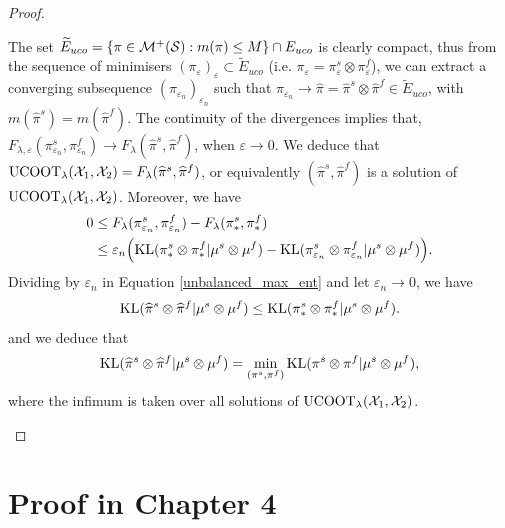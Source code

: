 \begin{proof}
\begin{enumerate}
    The set $\widetilde{E}_{uco} = \{\pi \in \mathcal M^+(\mathcal S): m(\pi) \leq M\} \cap E_{uco}$
    is clearly compact, thus from the sequence of minimisers
    $(\pi_{\varepsilon})_{\varepsilon} \subset \widetilde{E}_{uco}$
    (i.e. $\pi_{\varepsilon} = \pi_{\varepsilon}^s \otimes \pi_{\varepsilon}^f$), we can extract a
    converging subsequence $(\pi_{\varepsilon_n})_{\varepsilon_n}$ such that
    $\pi_{\varepsilon_n} \to \widehat{\pi} = \widehat{\pi}^s \otimes \widehat{\pi}^f \in \widetilde{E}_{uco}$,
    with $m(\widehat{\pi}^s) = m(\widehat{\pi}^f)$.
    The continuity of the divergences implies that,
    $F_{\lambda, \varepsilon}(\pi_{\varepsilon_n}^s, \pi_{\varepsilon_n}^f) \to
    F_{\lambda}(\widehat{\pi}^s, \widehat{\pi}^f)$, when $\varepsilon \to 0$. We deduce that
    $\text{UCOOT}_{\lambda}(\mathcal X_1, \mathcal X_2) = F_{\lambda}(\widehat{\pi}^s, \widehat{\pi}^f)$,
    or equivalently $(\widehat{\pi}^s, \widehat{\pi}^f)$
    is a solution of $\text{UCOOT}_{\lambda}(\mathcal X_1, \mathcal X_2)$. Moreover, we have
    \begin{equation} \label{unbalanced_max_ent}
      \begin{split}
        0 &\leq F_{\lambda}(\pi_{\varepsilon_n}^s, \pi_{\varepsilon_n}^f)
        - F_{\lambda}(\pi_*^s, \pi_*^f) \\
      &\leq \varepsilon_n \Big( \text{KL}(\pi_*^s \otimes \pi_*^f \vert \mu^s \otimes \mu^f) -
      \text{KL}(\pi_{\varepsilon_n}^s \otimes \pi_{\varepsilon_n}^f \vert \mu^s \otimes \mu^f) \Big).
      \end{split}
    \end{equation}
    Dividing by $\varepsilon_n$ in Equation \eqref{unbalanced_max_ent} and let
    $\varepsilon_n \to 0$, we have
    \begin{equation}
      \text{KL}(\widehat{\pi}^s \otimes \widehat{\pi}^f \vert \mu^s \otimes \mu^f) \leq
      \text{KL}(\pi_*^s \otimes \pi_*^f \vert \mu^s \otimes \mu^f).
    \end{equation}
    and we deduce that
    \begin{equation}
      \text{KL}(\widehat{\pi}^s \otimes \widehat{\pi}^f \vert \mu^s \otimes \mu^f) =
      \min_{(\pi^s, \pi^f)} \text{KL}(\pi^s \otimes \pi^f \vert \mu^s \otimes \mu^f),
    \end{equation}
    where the infimum is taken over all solutions of $\text{UCOOT}_{\lambda}(\mathcal X_1, \mathcal X_2)$.
  \end{enumerate}
\end{proof}

\section{Proof in Chapter 4}

